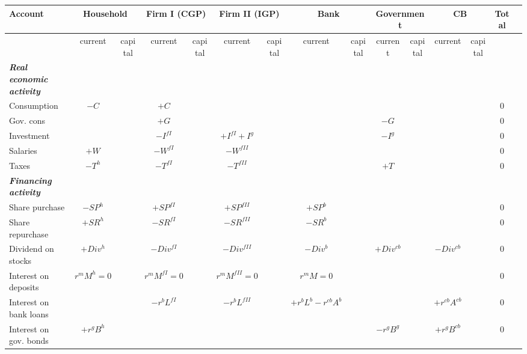 \thispagestyle{empty}
\begin{landscape}
\begin{table}
  \centering\footnotesize
  \begin{tabular}{|l|c|c|c|c|c|c|c|c|c|c|c|c|c|c|}
  \hline\hline
    Account     & \multicolumn{2}{c|}{Household} & \multicolumn{2}{c|}{Firm I (CGP)} & \multicolumn{2}{c|}{Firm II (IGP)} & \multicolumn{2}{c|}{Bank} & \multicolumn{2}{c|}{Government}  & \multicolumn{2}{c|}{CB} & Total \\\hline
      & current & capital & current & capital & current & capital & current & capital & current & capital & current  & capital &  \\
    \hline
\textbf{\emph{Real economic activity}} &&&&&&&&&&&&&\\
    \hline
    Consumption & $-C$ &     & $+C$ & &     &       &       &       &       &     &       &      & 0\\\hline
    Gov. cons   &      &     & $+G$ & & &   &  &  & $-G$ & &  & & 0\\\hline
    Investment  &      &  & $-I^{fI}$ &  &  $+I^{fI}+I^g$ & &  &  & $-I^g$ & &  & & 0\\\hline
    Salaries    & $+W$ & & $-W^{fI}$ &  & $-W^{fII}$  &  &  &  &  & &  & & 0\\\hline
    Taxes       & $-T^h$ &  & $-T^{fI}$ &  & $-T^{fII}$ &  &  &  &  $+T$ & &  & & 0\\
    \hline
\textbf{\emph{Financing activity}}  &&&&&&&&&&&&&\\
    \hline
    Share purchase     & $-SP^h$ &   & $+SP^{fI}$ & & $+SP^{fII}$ &  & $+SP^{b}$ & & & & & &  0   \\\hline  
    Share repurchase   & $+SR^h$ &   & $-SR^{fI}$ & & $-SR^{fII}$ &  & $-SR^{b}$ & & & & & &  0\\\hline
    Dividend on stocks & $+Div^h$&   & $-Div^{fI}$& & $-Div^{fII}$&  & $-Div^{b}$& & $+Div^{cb}$ & & $-Div^{cb}$ & &  0\\\hline
    Interest on deposits & $r^{m}M^{h}=0$ &  & $r^{m}M^{fI}=0$ &  & $r^{m}M^{fII}=0$ & & $r^{m} M=0$ &  &  & &  & & 0\\\hline
    Interest on bank loans  &  &  & $-r^{b} L^{fI}$ &  & $-r^{b} L^{fII}$ &  & $+r^b L^b - r^{cb}A^b$ & &  & & $+r^{cb}A^{cb}$ & & 0\\\hline
    Interest on gov. bonds  & $+r^{g} B^h$ & &  &  &   &  &  & &  $-r^g B^g$ & & $+r^{g} B^{cb}$ & & 0\\

\end{tabular}
\end{table}
\end{landscape}
